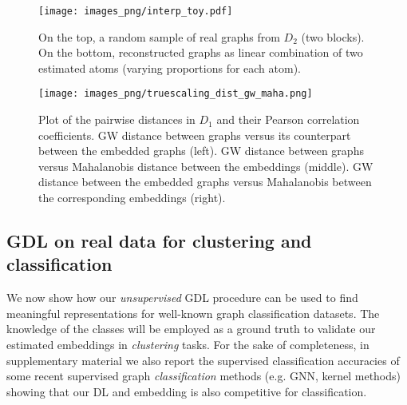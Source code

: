 \documentclass{article}
\begin{document}
	\begin{figure}[t]
		\centering
		\texttt{[image: images\_png/interp\_toy.pdf]}\vspace{-2mm}
		\caption{On the top, a random sample of real graphs from $D_2$ (two blocks). 
			On the bottom, reconstructed graphs as linear combination of two estimated atoms (varying proportions for each atom).} \label{fig:interp_toy}
	\end{figure}
	
	
	\begin{figure}[t]
		\centering
		\texttt{[image: images\_png/truescaling\_dist\_gw\_maha.png]}\vspace{-1mm}
		\caption{Plot of the pairwise distances in $D_1$ and their Pearson 
			correlation coefficients. GW distance between graphs versus its counterpart between the embedded graphs (left). GW distance between graphs versus  Mahalanobis distance between the embeddings (middle). GW distance between the embedded graphs versus Mahalanobis between the corresponding embeddings (right). } \label{fig:dist}
	\end{figure}
	
	
	\subsection{GDL on real data for clustering and classification}\label{subsec:real1} 
	We now show how our \emph{unsupervised} GDL procedure can be used to find meaningful representations for well-known graph classification datasets. The knowledge of the classes will be
	employed as a ground truth to validate our estimated embeddings in \emph{clustering} tasks. 
	For the sake of completeness, in supplementary material we also report the supervised
	classification accuracies of some recent supervised graph \emph{classification}
	methods (e.g. GNN, kernel methods) showing that our DL and embedding is
	also competitive for classification.
\end{document}
